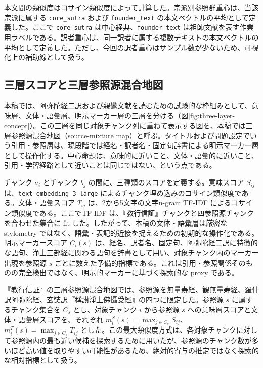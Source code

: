 \documentclass[uplatex,dvipdfmx,11pt,a4paper]{jsarticle}
\begin{document}
本文間の類似度はコサイン類似度によって計算した。宗派別参照群重心は、当該宗派に属する \texttt{core\_sutra} および \texttt{founder\_text} の本文ベクトルの平均として定義した。ここで \texttt{core\_sutra} は中心経典、\texttt{founder\_text} は祖師文献を表す作業用ラベルである。訳者重心は、同一訳者に属する複数テキストの本文ベクトルの平均として定義した。ただし、今回の訳者重心はサンプル数が少ないため、可視化上の補助線として扱う。

\subsection{三層スコアと三層参照源混合地図}

本稿では、阿弥陀経二訳および親鸞文献を読むための試験的な枠組みとして、意味層、文体・語彙層、明示マーカー層の三層を分ける（図\ref{fig:three-layer-concept}）。この三層を同じ対象チャンク列に重ねて表示する図を、本稿では三層参照源混合地図（source-mixture map）と呼ぶ。タイトルおよび問題設定でいう引用・参照層は、現段階では経名・訳者名・固定句辞書による明示マーカー層として操作化する。中心命題は、意味的に近いこと、文体・語彙的に近いこと、引用・学習経路として近いことは同じではない、という点である。

チャンク $a_i$ とチャンク $b_j$ の間に、三種類のスコアを定義する。意味スコア $S_{ij}$ は、\texttt{text-embedding-3-large} によるチャンク埋め込みのコサイン類似度である。文体・語彙スコア $T_{ij}$ は、2から5文字の文字n-gram TF-IDF によるコサイン類似度である。ここでTF-IDF は、『教行信証』チャンクと四参照源チャンクを合わせた集合に fit した。したがって、本稿の文体・語彙層は厳密な stylometry ではなく、語彙・表記的近接を捉えるための初期的な操作化である。明示マーカースコア $C_i(s)$ は、経名、訳者名、固定句、阿弥陀経二訳に特徴的な語句、浄土三部経に関わる語句を辞書として用い、対象チャンク内のマーカー出現を参照源 $s$ ごとに数えた予備的指標である。これは引用・参照関係そのものの完全検出ではなく、明示的マーカーに基づく探索的な proxy である。

『教行信証』の三層参照源混合地図では、参照源を無量寿経、観無量寿経、羅什訳阿弥陀経、玄奘訳『稱讃淨土佛攝受經』の四つに限定した。参照源 $s$ に属するチャンク集合を $C_s$ とし、対象チャンク $i$ から参照源 $s$ への意味層スコアと文体・語彙層スコアを、それぞれ $m_i^S(s)=\max_{j\in C_s} S_{ij}$、$m_i^T(s)=\max_{j\in C_s} T_{ij}$ とした。この最大類似度方式は、各対象チャンクに対して参照源内の最も近い候補を探索するために用いたが、参照源のチャンク数が多いほど高い値を取りやすい可能性があるため、絶対的寄与の推定ではなく探索的な相対指標として扱う。
\end{document}
